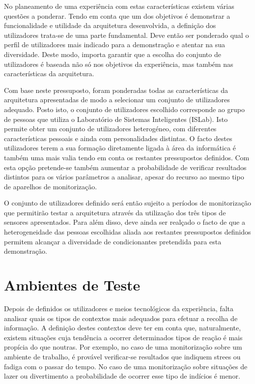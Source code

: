 No planeamento de uma experiência com estas características existem várias questões a ponderar. Tendo em conta que um dos objetivos é demonstrar a funcionalidade e utilidade da arquitetura desenvolvida, a definição dos utilizadores trata-se de uma parte fundamental. Deve então ser ponderado qual o perfil de utilizadores mais indicado para a demonstração e atentar na sua diversidade. Deste modo, importa garantir que a escolha do conjunto de utilizadores é baseada não só nos objetivos da experiência, mas também nas características da arquitetura.

Com base neste pressuposto, foram ponderadas todas as características da arquitetura apresentadas de modo a selecionar um conjunto de utilizadores adequado. Posto isto, o conjunto de utilizadores escolhido corresponde ao grupo de pessoas que utiliza o Laboratório de Sistemas Inteligentes (ISLab). Isto permite obter um conjunto de utilizadores heterogéneo, com diferentes características pessoais e ainda com personalidades distintas. O facto destes utilizadores terem a sua formação diretamente ligada à área da informática é também uma mais valia tendo em conta os restantes pressupostos definidos. Com esta opção pretende-se também aumentar a probabilidade de verificar resultados distintos para os vários parâmetros a analisar, apesar do recurso ao mesmo tipo de aparelhos de monitorização.

O conjunto de utilizadores definido será então sujeito a períodos de monitorização que permitirão testar a arquitetura através da utilização dos três tipos de sensores apresentados.  Para além disso, deve ainda ser realçado o facto de que a heterogeneidade das pessoas escolhidas aliada aos restantes pressupostos definidos permitem alcançar a diversidade de condicionantes pretendida para esta demonstração.


\section{Ambientes de Teste}

Depois de definidos os utilizadores e meios tecnológicos da experiência, falta analisar quais os tipos de contextos mais adequados para efetuar a recolha de informação. A definição destes contextos deve ter em conta que, naturalmente, existem situações cuja tendência a ocorrer determinados tipos de reação é mais propícia do que noutras. Por exemplo, no caso de uma monitorização sobre um ambiente de trabalho, é provável verificar-se resultados que indiquem strees ou fadiga com o passar do tempo. No caso de uma monitorização sobre situações de lazer ou divertimento a probabilidade de ocorrer esse tipo de indícios é menor.


